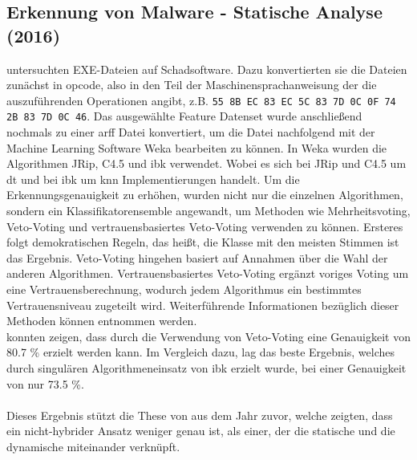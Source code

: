 \documentclass[
    12pt, %
    DIV10,
    ngerman, %
    a4paper, %
    oneside, %
    titlepage, %
    parskip=half, %
    headings=normal, %
    listof=totoc, %
    bibliography=totoc, %
    index=totoc, %
    captions=tableheading, %
    final %
]{scrreprt}
\begin{document}
\subsection{Erkennung von Malware - Statische Analyse (2016)}
\textcite{More2016} untersuchten EXE-Dateien auf Schadsoftware. Dazu konvertierten sie die Dateien zunächst in \ac{opcode}, also in den Teil der Maschinensprachanweisung der die auszuführenden Operationen angibt, z.B. \texttt{55 8B EC 83 EC 5C 83 7D 0C 0F 74 2B 83 7D 0C 46}. Das ausgewählte Feature Datenset wurde anschließend nochmals zu einer \ac{arff} Datei konvertiert, um die Datei nachfolgend mit der Machine Learning Software Weka bearbeiten zu können. 
In Weka wurden die Algorithmen JRip, C4.5 und \ac{ibk} verwendet. Wobei es sich bei JRip und C4.5 um \ac{dt} und bei \ac{ibk} um \ac{knn} Implementierungen handelt. Um die Erkennungsgenauigkeit zu erhöhen, wurden nicht nur die einzelnen Algorithmen, sondern ein Klassifikatorensemble angewandt, um Methoden wie Mehrheitsvoting, Veto-Voting und vertrauensbasiertes Veto-Voting verwenden zu können. Ersteres folgt demokratischen Regeln, das heißt, die Klasse mit den meisten Stimmen ist das Ergebnis. Veto-Voting hingehen basiert auf Annahmen über die Wahl der anderen Algorithmen. Vertrauensbasiertes Veto-Voting ergänzt voriges Voting um eine Vertrauensberechnung, wodurch jedem Algorithmus ein bestimmtes Vertrauensniveau zugeteilt wird. Weiterführende Informationen bezüglich dieser Methoden können \textcite{shahzad2013comparative} entnommen werden. \\
\textcite{More2016} konnten zeigen, dass durch die Verwendung von Veto-Voting eine Genauigkeit von 80.7 \% erzielt werden kann. Im Vergleich dazu, lag das beste Ergebnis, welches durch singulären Algorithmeneinsatz von \ac{ibk} erzielt wurde, bei einer Genauigkeit von nur 73.5 \%.\\\\
Dieses Ergebnis stützt die These von \textcite{Shijo2015} aus dem Jahr zuvor, welche zeigten, dass ein nicht-hybrider Ansatz weniger genau ist, als einer, der die statische und die dynamische miteinander verknüpft.
\end{document}

